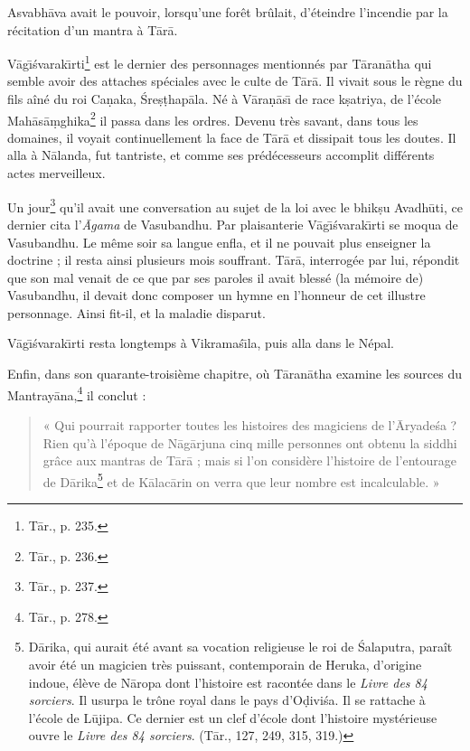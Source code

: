 \documentclass[a4paper, 11pt, oneside, french]{article}
\begin{document}
Asvabh\={a}va avait le pouvoir, lorsqu'une forêt brûlait, d'éteindre l'incendie par la récitation d'un mantra à T\={a}r\={a}.

V\={a}g\={\i}\'{s}varak\={\i}rti\footnote{T\={a}r., p. 235.} est le dernier des personnages mentionnés par T\={a}ran\={a}tha qui semble avoir des attaches spéciales avec le culte de T\={a}r\={a}. Il vivait sous le règne du fils aîné du roi Ca\d{n}aka, \'{S}re\d{s}\d{t}hap\={a}la. Né à V\={a}ra\d{n}\={a}s\={\i} de race k\d{s}atriya, de l'école Mah\={a}s\={a}\d{m}ghika\footnote{T\={a}r., p. 236.} il passa dans les ordres. Devenu très savant, dans tous les domaines, il voyait continuellement la face de T\={a}r\={a} et dissipait tous les doutes. Il alla à N\={a}landa, fut tantriste, et comme ses prédécesseurs accomplit différents actes merveilleux.

Un jour\footnote{T\={a}r., p. 237.} qu'il avait une conversation au sujet de la loi avec le bhik\d{s}u Avadh\={u}ti, ce dernier cita l'\emph{\={A}gama} de Vasubandhu. Par plaisanterie V\={a}g\={\i}\'{s}varak\={\i}rti se moqua de Vasubandhu. Le même soir sa langue enfla, et il ne pouvait plus enseigner la doctrine ; il resta ainsi plusieurs mois souffrant. T\={a}r\={a}, interrogée par lui, répondit que son mal venait de ce que par ses paroles il avait blessé (la mémoire de) Vasubandhu, il devait donc composer un hymne en l'honneur de cet illustre personnage. Ainsi fit-il, et la maladie disparut.

V\={a}g\={\i}\'{s}varak\={\i}rti resta longtemps à Vikrama\'{s}\={\i}la, puis alla dans le Népal.

Enfin, dans son quarante-troisième chapitre, où T\={a}ran\={a}tha examine les sources du Mantray\={a}na,\footnote{T\={a}r., p. 278.} il conclut :
\begin{quotation}
« Qui pourrait rapporter toutes les histoires des magiciens de l'\={A}ryade\'{s}a ? Rien qu'à l'époque de N\={a}g\={a}rjuna cinq mille personnes ont obtenu la siddhi grâce aux mantras de T\={a}r\={a} ; mais si l'on considère l'histoire de l'entourage de D\={a}rika\footnote{D\={a}rika, qui aurait été avant sa vocation religieuse le roi de \'{S}alaputra, paraît avoir été un magicien très puissant, contemporain de Heruka, d'origine indoue, élève de N\={a}ropa dont l'histoire est racontée dans le \emph{Livre des 84 sorciers}. Il usurpa le trône royal dans le pays d'O\d{d}ivi\'{s}a. Il se rattache à l'école de L\={u}jipa. Ce dernier est un clef d'école dont l'histoire mystérieuse ouvre le \emph{Livre des 84 sorciers}. (T\={a}r., 127, 249, 315, 319.)} et de K\={a}lac\={a}rin on verra que leur nombre est incalculable. »
\end{quotation}
\end{document}
